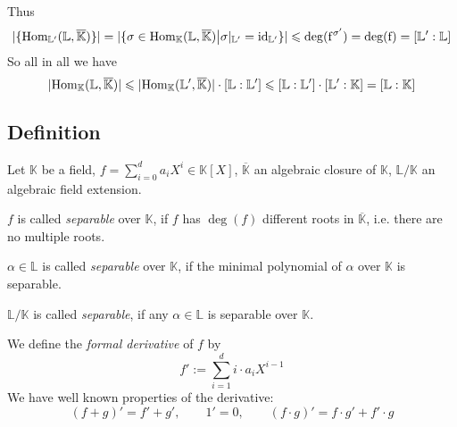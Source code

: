 \documentclass[12pt]{book}
\begin{document}
\begin{spacing}{1.3}
Thus
$$ \vert \{\textrm{Hom}_{\mathbb{L}'}(\mathbb{L}, \overline{\mathbb{K}}) \}\vert=\vert \{\sigma \in \rm{Hom}_{\mathbb{K}}(\mathbb{L}, \overline{\mathbb{K}}) \big \vert \sigma |_{\mathbb{L}'}=\textrm{id}_{\mathbb{L}'}\} \vert \leqslant \deg(f^{\sigma'}) = deg (f) = [\mathbb{L}':\mathbb{L}]$$
So all in all we have
$$\vert \rm{Hom}_{\mathbb{K}}(\mathbb{L}, \overline{\mathbb{K}}) \vert \leqslant \vert \rm{Hom}_{\mathbb{K}}(\mathbb{L}', \overline{\mathbb{K}}) \vert \cdot [\mathbb{L}:\mathbb{L}'] \leqslant [\mathbb{L}:\mathbb{L}'] \cdot [\mathbb{L}':\mathbb{K}]=[\mathbb{L}:\mathbb{K}]$$

\subsection{Definition} %
Let $\mathbb{K}$ be a field, $f=\sum_{i=0}^d a_i X^{i} \in \mathbb{K}[X]$, $\overline{\mathbb{K}}$ an algebraic closure of $\mathbb{K}$, $\mathbb{L}/\mathbb{K}$ an algebraic field extension.
\begin{compactenum}
\item $f$ is called \textit{separable} over $\mathbb{K}$, if $f$ has $\deg(f)$ different roots in $\overline{\mathbb{K}}$, i.e. there are no multiple roots.
\item $\alpha \in \mathbb{L}$ is called \textit{separable} over $\mathbb{K}$, if the minimal polynomial of $\alpha$ over $\mathbb{K}$ is separable.
\item $\mathbb{L}/\mathbb{K}$ is called \textit{separable}, if any $\alpha \in \mathbb{L}$ is separable over $\mathbb{K}$. 
\item We define the \textit{formal derivative} of $f$ by $$f':=\sum_{i=1}^d i \cdot a_iX^{i-1}$$We have well known properties of the derivative:
$$(f+g)'=f'+g', \qquad1'=0, \qquad (f\cdot g)'=f\cdot g'+f'\cdot g$$
\end{compactenum}


\end{spacing}
\end{document}
